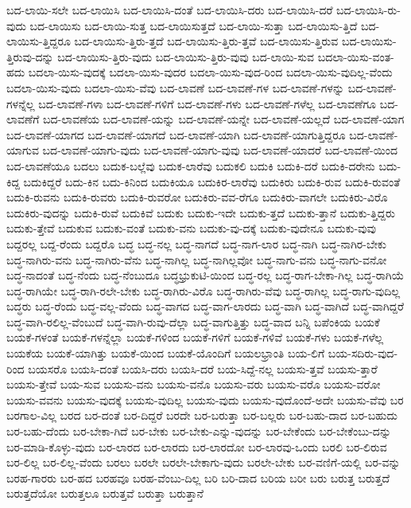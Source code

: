 {ಬದ-ಲಾಯಿ-ಸಲೇ
ಬದ-ಲಾಯಿಸಿ
ಬದ-ಲಾಯಿಸಿ-ದಂತೆ
ಬದ-ಲಾಯಿಸಿ-ದರು
ಬದ-ಲಾಯಿಸಿ-ದರೆ
ಬದ-ಲಾಯಿಸಿ-ರು-ವುದು
ಬದ-ಲಾಯಿಸು
ಬದ-ಲಾಯಿ-ಸುತ್ತ
ಬದ-ಲಾಯಿಸುತ್ತದೆ
ಬದ-ಲಾಯಿ-ಸುತ್ತಾ
ಬದ-ಲಾಯಿಸು-ತ್ತಿದೆ
ಬದ-ಲಾಯಿಸು-ತ್ತಿದ್ದರೂ
ಬದ-ಲಾಯಿಸು-ತ್ತಿರು-ತ್ತದೆ
ಬದ-ಲಾಯಿಸು-ತ್ತಿರು-ತ್ತವೆ
ಬದ-ಲಾಯಿಸು-ತ್ತಿರುವ
ಬದ-ಲಾಯಿಸು-ತ್ತಿರುವು-ದನ್ನು
ಬದ-ಲಾಯಿಸು-ತ್ತಿರು-ವುದು
ಬದ-ಲಾಯಿಸು-ತ್ತಿರು-ವುವು
ಬದ-ಲಾಯಿ-ಸುವ
ಬದಲಾ-ಯಿಸು-ವಂತ-ಹದು
ಬದಲಾ-ಯಿಸು-ವುದಕ್ಕೆ
ಬದಲಾ-ಯಿಸು-ವುದರ
ಬದಲಾ-ಯಿಸು-ವುದ-ರಿಂದ
ಬದಲಾ-ಯಿಸು-ವುದಿಲ್ಲ-ವೆಂದು
ಬದಲಾ-ಯಿಸು-ವುದು
ಬದಲಾ-ಯಿಸು-ವೆವು
ಬದ-ಲಾವಣೆ
ಬದ-ಲಾವಣೆ-ಗಳ
ಬದ-ಲಾವಣೆ-ಗಳನ್ನು
ಬದ-ಲಾವಣೆ-ಗಳನ್ನೆಲ್ಲ
ಬದ-ಲಾವಣೆ-ಗಳಾ
ಬದ-ಲಾವಣೆ-ಗಳಿಗೆ
ಬದ-ಲಾವಣೆ-ಗಳು
ಬದ-ಲಾವಣೆ-ಗಳೆಲ್ಲ
ಬದ-ಲಾವಣೆಗೂ
ಬದ-ಲಾವಣೆಗೆ
ಬದ-ಲಾವಣೆಯ
ಬದ-ಲಾವಣೆ-ಯನ್ನು
ಬದ-ಲಾವಣೆ-ಯನ್ನೇ
ಬದ-ಲಾವಣೆ-ಯಲ್ಲದೆ
ಬದ-ಲಾವಣೆ-ಯಾಗ
ಬದ-ಲಾವಣೆ-ಯಾಗದ
ಬದ-ಲಾವಣೆ-ಯಾಗದೆ
ಬದ-ಲಾವಣೆ-ಯಾಗಿ
ಬದ-ಲಾವಣೆ-ಯಾಗುತ್ತಿದ್ದರೂ
ಬದ-ಲಾವಣೆ-ಯಾಗುವ
ಬದ-ಲಾವಣೆ-ಯಾಗು-ವುದು
ಬದ-ಲಾವಣೆ-ಯಾಗು-ವುವು
ಬದ-ಲಾವಣೆ-ಯಾದರೆ
ಬದ-ಲಾವಣೆ-ಯಿಂದ
ಬದ-ಲಾವಣೆಯೂ
ಬದಲು
ಬದುಕ-ಬಲ್ಲೆವು
ಬದುಕ-ಲಾರೆವು
ಬದುಕಲಿ
ಬದುಕಿ
ಬದುಕಿ-ದರೆ
ಬದುಕಿ-ದರೇನು
ಬದು-ಕಿದ್ದ
ಬದುಕಿದ್ದರೆ
ಬದು-ಕಿನ
ಬದು-ಕಿನಿಂದ
ಬದುಕಿಯೂ
ಬದುಕಿರ-ಲಾರೆವು
ಬದುಕಿರು
ಬದುಕಿ-ರುವ
ಬದುಕಿ-ರುವಂತೆ
ಬದುಕಿ-ರುವನು
ಬದುಕಿ-ರುವರು
ಬದುಕಿ-ರುವರೋ
ಬದುಕಿರು-ವವ-ರೆಗೂ
ಬದುಕಿರು-ವಾಗಲೇ
ಬದುಕಿರು-ವಿರೊ
ಬದುಕಿರು-ವುದನ್ನು
ಬದುಕಿ-ರುವೆ
ಬದುಕಿವೆ
ಬದುಕು
ಬದುಕು-ಇದೇ
ಬದುಕು-ತ್ತದೆ
ಬದುಕು-ತ್ತಾನೆ
ಬದುಕು-ತ್ತಿದ್ದರು
ಬದುಕು-ತ್ತೇವೆ
ಬದುಕುವ
ಬದುಕು-ವಂತೆ
ಬದುಕು-ವನು
ಬದುಕು-ವು-ದಕ್ಕೆ
ಬದುಕು-ವುದೇನೂ
ಬದುಕು-ವುವು
ಬದ್ದರಲ್ಲ
ಬದ್ದ-ರೆಂದು
ಬದ್ದರೊ
ಬದ್ಧ
ಬದ್ಧ-ನಲ್ಲ
ಬದ್ಧ-ನಾಗದೆ
ಬದ್ಧ-ನಾಗ-ಲಾರ
ಬದ್ಧ-ನಾಗಿ
ಬದ್ಧ-ನಾಗಿರ-ಬೇಕು
ಬದ್ಧ-ನಾಗಿರು-ವನು
ಬದ್ಧ-ನಾಗಿರು-ವೆನು
ಬದ್ಧ-ನಾಗಿಲ್ಲ
ಬದ್ಧ-ನಾಗಿಲ್ಲವೋ
ಬದ್ಧ-ನಾಗು-ವನು
ಬದ್ಧ-ನಾಗು-ವನೋ
ಬದ್ಧ-ನಾದಂತೆ
ಬದ್ಧ-ನೆಂದು
ಬದ್ಧ-ನೆಂಬುದೂ
ಬದ್ಧಭ್ರುಕುಟಿ-ಯಿಂದ
ಬದ್ಧ-ರಲ್ಲ
ಬದ್ಧ-ರಾಗ-ಬೇಕಾ-ಗಿಲ್ಲ
ಬದ್ಧ-ರಾಗಿಯೆ
ಬದ್ಧ-ರಾಗಿಯೇ
ಬದ್ಧ-ರಾಗಿ-ರಲೇ-ಬೇಕು
ಬದ್ಧ-ರಾಗಿರು-ವಿರೊ
ಬದ್ಧ-ರಾಗಿರು-ವೆವು
ಬದ್ಧ-ರಾಗಿಲ್ಲ
ಬದ್ಧ-ರಾಗು-ವುದಿಲ್ಲ
ಬದ್ಧರು
ಬದ್ಧ-ರೆಂದು
ಬದ್ಧ-ವಲ್ಲ-ವೆಂದು
ಬದ್ಧ-ವಾಗದ
ಬದ್ಧ-ವಾಗ-ಲಾರದು
ಬದ್ಧ-ವಾಗಿ
ಬದ್ಧ-ವಾಗಿದೆ
ಬದ್ಧ-ವಾಗಿದ್ದರೆ
ಬದ್ಧ-ವಾಗಿ-ರಲಿಲ್ಲ-ವೆಂಬುದೆ
ಬದ್ಧ-ವಾಗಿ-ರುವು-ದೆಲ್ಲಾ
ಬದ್ಧ-ವಾಗುತ್ತಿತ್ತು
ಬದ್ಧ-ವಾದ
ಬನ್ನಿ
ಬಪೆಂಕಿಯ
ಬಯಕೆ
ಬಯಕೆ-ಗಳಂತೆ
ಬಯಕೆ-ಗಳನ್ನೆಲ್ಲಾ
ಬಯಕೆ-ಗಳಿಂದ
ಬಯಕೆ-ಗಳಿಗೆ
ಬಯಕೆ-ಗಳಿವೆ
ಬಯಕೆ-ಗಳು
ಬಯಕೆ-ಗಳೆಲ್ಲ
ಬಯಕೆಯ
ಬಯಕೆ-ಯಾಗಿತ್ತು
ಬಯಕೆ-ಯಿಂದ
ಬಯಕೆ-ಯೊಂದಿಗೆ
ಬಯಲಭ್ರಾಂತಿ
ಬಯ-ಲಿಗೆ
ಬಯ-ಸದಿರು-ವುದ-ರಿಂದ
ಬಯಸರೊ
ಬಯಸಿ-ದಂತೆ
ಬಯಸಿ-ದರು
ಬಯಸಿ-ದರೆ
ಬಯ-ಸಿದ್ದೆ-ನಲ್ಲ
ಬಯಸು-ತ್ತವೆ
ಬಯಸು-ತ್ತಾರೆ
ಬಯಸು-ತ್ತೇವೆ
ಬಯ-ಸುವ
ಬಯಸು-ವನು
ಬಯಸು-ವನೊ
ಬಯಸು-ವರು
ಬಯಸು-ವರೊ
ಬಯಸು-ವರೋ
ಬಯಸು-ವವನು
ಬಯಸು-ವುದಕ್ಕೆ
ಬಯಸು-ವುದಿಲ್ಲ
ಬಯಸು-ವುದು
ಬಯಸು-ವುದೊಂದೆ-ಅದೇ
ಬಯಸು-ವೆವು
ಬರ
ಬರಗಾಲ-ವಿಲ್ಲ
ಬರದ
ಬರ-ದಂತೆ
ಬರ-ದಿದ್ದರೆ
ಬರದೇ
ಬರ-ಬರುತ್ತಾ
ಬರ-ಬಲ್ಲರು
ಬರ-ಬಹು-ದಾದ
ಬರ-ಬಹುದು
ಬರ-ಬಹು-ದೆಂದು
ಬರ-ಬೇಕಾ-ಗಿದೆ
ಬರ-ಬೇಕು
ಬರ-ಬೇಕು-ಎನ್ನು-ವುದನ್ನು
ಬರ-ಬೇಕೆಂದು
ಬರ-ಬೇಕೆಂಬು-ದನ್ನು
ಬರ-ಮಾಡಿ-ಕೊಳ್ಳು-ವುದು
ಬರ-ಲಾರದ
ಬರ-ಲಾರದು
ಬರ-ಲಾರದೋ
ಬರ-ಲಾರವು-ಒಂದು
ಬರಲಿ
ಬರ-ಲಿರುವ
ಬರ-ಲಿಲ್ಲ
ಬರ-ಲಿಲ್ಲ-ವೆಂದು
ಬರಲು
ಬರಲೇ
ಬರಲೇ-ಬೇಕಾಗು-ವುದು
ಬರಲೇ-ಬೇಕು
ಬರ-ವಣಿಗೆ-ಯಲ್ಲಿ
ಬರ-ವನ್ನು
ಬರಹ-ಗಾರರು
ಬರ-ಹದ
ಬರಹವೂ
ಬರಹ-ವೆಂಬು-ದಿಲ್ಲ
ಬರಿ
ಬರಿ-ದಾದ
ಬರಿಯ
ಬರೀ
ಬರು
ಬರುತ್ತ
ಬರುತ್ತದೆ
ಬರುತ್ತದೆಯೋ
ಬರುತ್ತಲೂ
ಬರುತ್ತವೆ
ಬರುತ್ತಾ
ಬರುತ್ತಾನೆ
}
